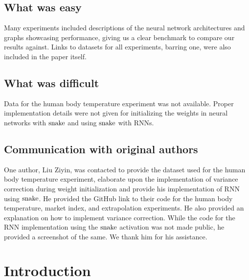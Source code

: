 \subsection*{What was easy}

Many experiments included descriptions of the neural network architectures and graphs showcasing performance, giving us a clear benchmark to compare our results against. Links to datasets for all experiments, barring one, were also included in the paper itself.

\subsection*{What was difficult}

Data for the human body temperature experiment was not available. Proper implementation details were not given for initializing the weights in neural networks with \( \operatorname{snake} \) and using \( \operatorname{snake} \) with RNNs.

\subsection*{Communication with original authors}

One author, Liu Ziyin, was contacted to provide the dataset used for the human body temperature experiment, elaborate upon the implementation of variance correction during weight initialization and provide his implementation of RNN using \(  \operatorname{snake} \). He provided the GitHub link to their code for the human body temperature, market index, and extrapolation experiments. He also provided an explanation on how to implement variance correction. While the code for the RNN implementation using the \(  \operatorname{snake} \) activation was not made public, he provided a screenshot of the same. We thank him for his assistance. 

\section{Introduction}

